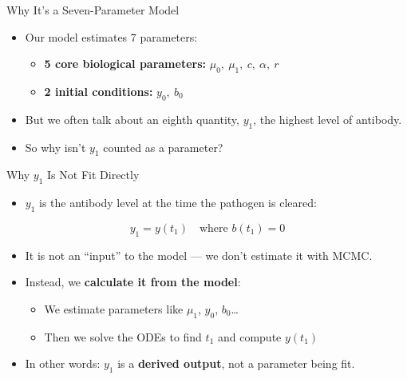 \documentclass[
  ignorenonframetext,
]{beamer}
\providecommand{\tightlist}{%
  \setlength{\itemsep}{0pt}\setlength{\parskip}{0pt}}\usepackage{longtable,booktabs,array}
\begin{document}
\begin{frame}{Why It's a Seven-Parameter Model}
\label{why-its-a-seven-parameter-model}
\begin{itemize}
\tightlist
\item
  Our model estimates 7 parameters:

  \begin{itemize}
  \tightlist
  \item
    \textbf{5 core biological parameters:}
    \(\mu_0,\ \mu_1,\ c,\ \alpha,\ r\)
  \item
    \textbf{2 initial conditions:} \(y_0,\ b_0\)
  \end{itemize}
\item
  But we often talk about an eighth quantity, \(y_1\), the highest level
  of antibody.
\item
  So why isn't \(y_1\) counted as a parameter?
\end{itemize}
\end{frame}

\begin{frame}{Why \(y_1\) Is Not Fit Directly}
\label{why-y_1-is-not-fit-directly}
\begin{itemize}
\tightlist
\item
  \(y_1\) is the antibody level at the time the pathogen is cleared:
\end{itemize}

\[
y_1 = y(t_1) \quad \text{where } b(t_1) = 0
\]

\begin{itemize}
\tightlist
\item
  It is not an ``input'' to the model --- we don't estimate it with
  MCMC.
\item
  Instead, we \textbf{calculate it from the model}:

  \begin{itemize}
  \tightlist
  \item
    We estimate parameters like \(\mu_1\), \(y_0\), \(b_0\)\ldots{}
  \item
    Then we solve the ODEs to find \(t_1\) and compute \(y(t_1)\)
  \end{itemize}
\item
  In other words: \(y_1\) is a \textbf{derived output}, not a parameter
  being fit.
\end{itemize}
\end{frame}
\end{document}
